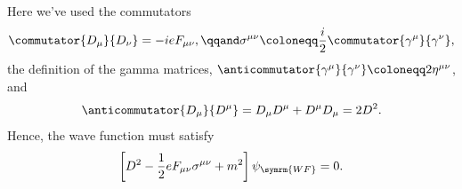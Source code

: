 \documentclass[fleqn]{NotesClass}
\newcommand{\covariantDerivative}{D}
\newcommand{\minkowskiMetric}{\eta}
\begin{document}
    Here we've used the commutators
    \begin{equation}
        \commutator{\covariantDerivative_\mu}{\covariantDerivative_\nu} = -ieF_{\mu\nu}, \qqand \sigma^{\mu\nu} \coloneqq \frac{i}{2}\commutator{\gamma^\mu}{\gamma^\nu},
    \end{equation}
    the definition of the gamma matrices, \(\anticommutator{\gamma^\mu}{\gamma^\nu} \coloneqq 2\minkowskiMetric^{\mu\nu}\), and
    \begin{equation}
        \anticommutator{\covariantDerivative_\mu}{\covariantDerivative^\mu} = \covariantDerivative_\mu \covariantDerivative^\mu + \covariantDerivative^\mu \covariantDerivative_\mu = 2\covariantDerivative^2.
    \end{equation}
    Hence, the wave function must satisfy 
    \begin{equation}\label{eqn:qed klein gordon}
        \left[ \covariantDerivative^2 - \frac{1}{2}eF_{\mu\nu}\sigma^{\mu\nu} + m^2 \right] \psi_{\symrm{WF}} = 0.
    \end{equation}
\end{document}
